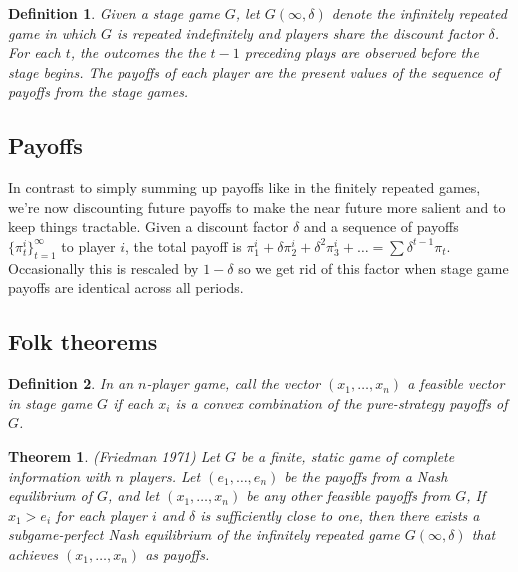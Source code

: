 \documentclass[letter, 10pt]{article}
\newtheorem{definition}{Definition}[section]
\newtheorem{theorem}{Theorem}[section]
\begin{document}
\begin{spacing}{1.1}
\begin{definition}
  Given a stage game $G$, let $G(\infty, \delta)$ denote
  the infinitely repeated game in which $G$ is repeated
  indefinitely and players share the discount factor
  $\delta$. For each $t$, the outcomes the the $t-1$
  preceding plays are observed before the stage
  begins. The payoffs of each player are the present
  values of the sequence of payoffs from the stage games.
\end{definition}

\subsection{Payoffs}
 In contrast to simply summing up payoffs like in the
 finitely repeated games, we're now discounting future
 payoffs to make the near future more salient and to keep
 things tractable. Given a discount factor $\delta$ and a
 sequence of payoffs $\{\pi_t^i\}_{t=1}^\infty$ to player
 $i$, the total payoff is
 $\pi_1^i+\delta\pi_2^i+\delta^2\pi_3^i+\ldots = \sum
 \delta^{t-1} \pi_t$. Occasionally this is rescaled by
 $1-\delta$ so we get rid of this factor when stage game
 payoffs are identical across all periods.

\subsection{Folk theorems}

\begin{definition}
  In an $n$-player game, call the vector $(x_1,\ldots,
  x_n)$ a \textit{feasible vector} in stage game $G$ if each $x_i$
  is a convex combination of the pure-strategy payoffs of $G$.
\end{definition}

\begin{theorem}
  (Friedman 1971) Let $G$ be a finite, static game of
  complete information with $n$ players. Let $(e_1,
  \ldots, e_n)$ be the payoffs from a Nash equilibrium of
  $G$, and let $(x_1, \ldots, x_n)$ be any other feasible
  payoffs from $G$, If $x_1 > e_i$ for each player $i$
  and $\delta$ is sufficiently close to one, then there
  exists a subgame-perfect Nash equilibrium of the
  infinitely repeated game $G(\infty, \delta)$ that
  achieves $(x_1, \ldots, x_n)$ as payoffs.
\end{theorem}


\end{spacing}
\end{document}
